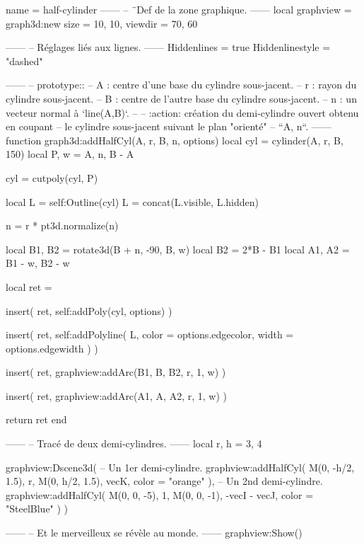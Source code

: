 \documentclass{standalone}
\begin{document}
\begin{luadraw}{name = half-cylinder}
------
-- ¨Def de la zone graphique.
------
local graphview = graph3d:new{
  size    = {10, 10},
  viewdir = {70, 60}
}

------
-- Réglages liés aux lignes.
------
Hiddenlines     = true
Hiddenlinestyle = "dashed"

------
-- prototype::
--     A : centre d'une base du cylindre sous-jacent.
--     r : rayon du cylindre sous-jacent.
--     B : centre de l'autre base du cylindre sous-jacent.
--     n : un vecteur normal à `line(A,B)`.
--
--     :action: création du demi-cylindre ouvert obtenu en coupant
--              le cylindre sous-jacent suivant le plan "orienté"
--              ``{A, n}``.
------
function graph3d:addHalfCyl(A, r, B, n, options)
  local cyl  = cylinder(A, r, B, 150)
  local P, w = {A, n}, B - A

  cyl = cutpoly(cyl, P)

  local L = self:Outline(cyl)
  L = concat(L.visible, L.hidden)

  n = r * pt3d.normalize(n)

  local B1, B2 = rotate3d(B + n, -90, {B, w})
  local B2     = 2*B - B1
  local A1, A2 = B1 - w, B2 - w

  local ret = {}

  insert(
    ret,
    self:addPoly(cyl, options)
  )

  insert(
    ret,
    self:addPolyline(
      L,
      {
        color = options.edgecolor,
        width = options.edgewidth
      }
    )
  )

  insert(
    ret,
    graphview:addArc(B1, B, B2, r, 1, w)
  )

  insert(
    ret,
    graphview:addArc(A1, A, A2, r, 1, w)
  )

  return ret
end

------
-- Tracé de deux demi-cylindres.
------
local r, h = 3, 4

graphview:Dscene3d(
-- Un 1er demi-cylindre.
  graphview:addHalfCyl(
    M(0, -h/2, 1.5), r,
    M(0, h/2, 1.5), vecK,
    {color = "orange"}
  ),
-- Un 2nd demi-cylindre.
  graphview:addHalfCyl(
    M(0, 0, -5), 1,
    M(0, 0, -1), -vecI - vecJ,
    {color = "SteelBlue"}
  )
)

------
-- Et le merveilleux se révèle au monde.
------
graphview:Show()
\end{luadraw}
\end{document}
